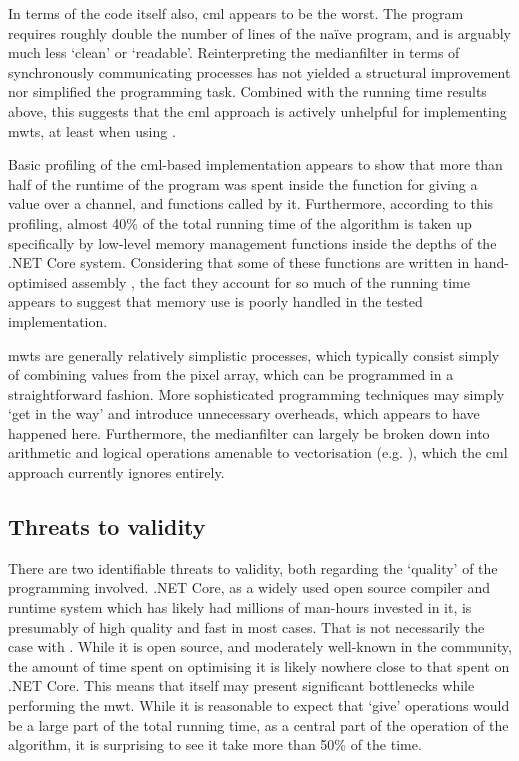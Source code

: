 In terms of the code itself also, \gls{cml} appears to be the worst.  The program requires roughly double the number of lines of the naïve program, and is arguably much less `clean' or `readable'.  Reinterpreting the \gls{medianfilter} in terms of synchronously communicating processes has not yielded a structural improvement nor simplified the programming task.  Combined with the running time results above, this suggests that the \gls{cml} approach is actively unhelpful for implementing \glspl{mwt}, at least when using \hopac{}.

Basic profiling of the \gls{cml}-based implementation appears to show that more than half of the runtime of the program was spent inside the function for giving a value over a channel, and functions called by it.  Furthermore, according to this profiling, almost 40\% of the total running time of the algorithm is taken up specifically by low-level memory management functions inside the depths of the .NET Core system.  Considering that some of these functions are written in hand-optimised assembly , the fact they account for so much of the running time appears to suggest that memory use is poorly handled in the tested implementation.

\Glspl{mwt} are generally relatively simplistic processes, which typically consist simply of combining values from the pixel array, which can be programmed in a straightforward fashion.  More sophisticated programming techniques may simply `get in the way' and introduce unnecessary overheads, which appears to have happened here.  Furthermore, the \gls{medianfilter} can largely be broken down into arithmetic and logical operations amenable to vectorisation (e.g. \cite{Sanchez2012,Perreault2007}), which the \gls{cml} approach currently ignores entirely.

\subsection{Threats to validity}
There are two identifiable threats to validity, both regarding the `quality' of the programming involved.  .NET Core, as a widely used open source compiler and runtime system which has likely had millions of man-hours invested in it, is presumably of high quality and fast in most cases.  That is not necessarily the case with \hopac{}.  While it is open source, and moderately well-known in the \fsharp{} community, the amount of time spent on optimising it is likely nowhere close to that spent on .NET Core.  This means that \hopac{} itself may present significant bottlenecks while performing the \gls{mwt}.  While it is reasonable to expect that `give' operations would be a large part of the total running time, as a central part of the operation of the algorithm, it is surprising to see it take more than 50\% of the time.

